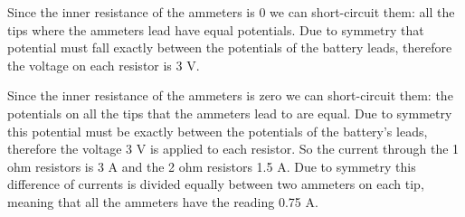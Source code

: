 \hinteng
Since the inner resistance of the ammeters is 0 we can short-circuit them: all the tips where the ammeters lead have equal potentials. Due to symmetry that potential must fall exactly between the potentials of the battery leads, therefore the voltage on each resistor is 3 V.

\solueng
Since the inner resistance of the ammeters is zero we can short-circuit them: the potentials on all the tips that the ammeters lead to are equal. Due to symmetry this potential must be exactly between the potentials of the battery’s leads, therefore the voltage 3 V is applied to each resistor. So the current through the 1 ohm resistors is 3 A and the 2 ohm resistors 1.5 A. Due to symmetry this difference of currents is divided equally between two ammeters on each tip, meaning that all the ammeters have the reading 0.75 A.
\probend